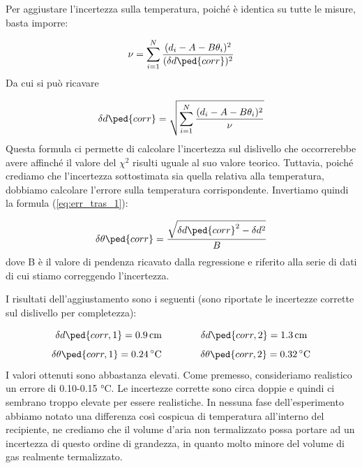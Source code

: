 Per aggiustare l'incertezza sulla temperatura, poiché è identica su tutte le misure, basta imporre:

\begin{equation}
    \nu = \sum_{i=1}^{N} \frac{(d_i - A - B\theta_i)^2}{(\delta d\ped{corr})^2}
\end{equation}
%
Da cui si può ricavare

\begin{equation}
    \delta d\ped{corr} = \sqrt{\sum_{i=1}^{N} \frac{(d_i - A - B\theta_i)^2}{\nu}}
    \label{eq:corr_err}
\end{equation}
%
Questa formula ci permette di calcolare l'incertezza sul dislivello che occorrerebbe avere affinché il valore del $\chi^2$
risulti uguale al suo valore teorico. Tuttavia, poiché crediamo che l'incertezza sottostimata sia quella relativa alla temperatura,
dobbiamo calcolare l'errore sulla temperatura corrispondente. Invertiamo quindi la formula (\ref{eq:err_tras_1}):

\begin{equation}
    \delta \theta\ped{corr} = \frac{\sqrt{\delta d\ped{corr}^2 - \delta d^2}}{B}
    \label{eq:corr_err_theta}
\end{equation}
%
dove B è il valore di pendenza ricavato dalla regressione e riferito alla serie di dati di cui stiamo correggendo l'incertezza.

I risultati dell'aggiustamento sono i seguenti (sono riportate le incertezze corrette sul dislivello per completezza):

\begin{equation}
    \delta d\ped{corr,1} = \SI{0.9}{\centi\meter} \qquad \qquad \delta d\ped{corr,2} = \SI{1.3}{\centi\metre}
\end{equation}
\begin{equation}
    \delta \theta\ped{corr,1} = \SI{0.24}{\celsius} \qquad \qquad \delta \theta\ped{corr,2} = \SI{0.32}{\celsius}
\end{equation}
%
I valori ottenuti sono abbastanza elevati. Come premesso, consideriamo realistico un errore di 0.10-0.15 \si{\celsius}.
Le incertezze corrette sono circa doppie e quindi ci sembrano troppo elevate per essere realistiche. In nessuna fase
dell'esperimento abbiamo notato una differenza così cospicua di temperatura all'interno del recipiente, ne crediamo che
il volume d'aria non termalizzato possa portare ad un incertezza di questo ordine di grandezza, in quanto molto minore
del volume di gas realmente termalizzato.

